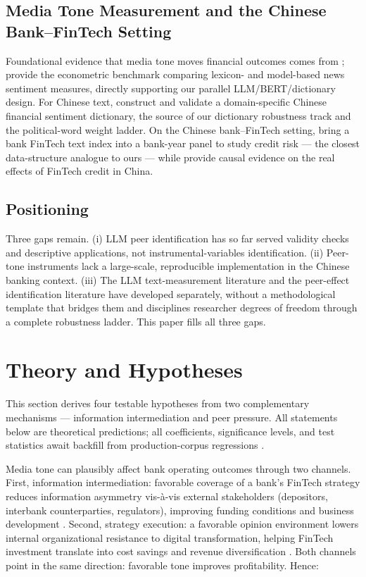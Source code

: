 \subsection{Media Tone Measurement and the Chinese Bank--FinTech Setting}
Foundational evidence that media tone moves financial outcomes comes from
\textcite{tetlock2007media}; \textcite{shapiro2022newssentiment} provide the econometric
benchmark comparing lexicon- and model-based news sentiment measures, directly supporting our
parallel LLM/BERT/dictionary design. For Chinese text, \textcite{du2022chinesedict} construct
and validate a domain-specific Chinese financial sentiment dictionary, the source of our
dictionary robustness track and the political-word weight ladder. On the Chinese bank--FinTech
setting, \textcite{cheng2020bankfintech} bring a bank FinTech text index into a bank-year
panel to study credit risk --- the closest data-structure analogue to ours --- while
\textcite{hau2024fintechcredit} provide causal evidence on the real effects of FinTech credit
in China.

\subsection{Positioning}
Three gaps remain. (i) LLM peer identification \parencite{cao2025genai} has so far served
validity checks and descriptive applications, not instrumental-variables identification.
(ii) Peer-tone instruments lack a large-scale, reproducible implementation in the Chinese
banking context. (iii) The LLM text-measurement literature and the peer-effect identification
literature have developed separately, without a methodological template that bridges them and
disciplines researcher degrees of freedom through a complete robustness ladder. This paper
fills all three gaps.

\section{Theory and Hypotheses}\label{sec:theory}

This section derives four testable hypotheses from two complementary mechanisms --- information
intermediation and peer pressure. All statements below are theoretical predictions; all
coefficients, significance levels, and test statistics await backfill from production-corpus
regressions .

Media tone can plausibly affect bank operating outcomes through two channels. First,
information intermediation: favorable coverage of a bank's FinTech strategy reduces information
asymmetry vis-\`a-vis external stakeholders (depositors, interbank counterparties, regulators),
improving funding conditions and business development \parencite{tetlock2007media}. Second,
strategy execution: a favorable opinion environment lowers internal organizational resistance
to digital transformation, helping FinTech investment translate into cost savings and revenue
diversification \parencite{cheng2020bankfintech,hau2024fintechcredit}. Both channels point in
the same direction: favorable tone improves profitability. Hence:

